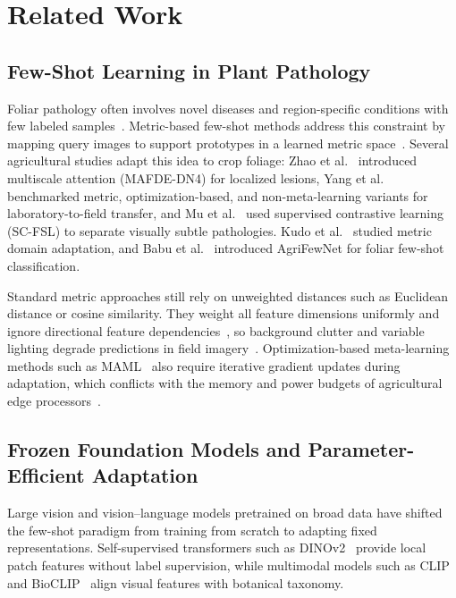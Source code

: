 \section{Related Work}
\label{sec:related_work}

\subsection{Few-Shot Learning in Plant Pathology}
Foliar pathology often involves novel diseases and region-specific conditions with few labeled samples~\cite{shoaib2023advanced,sun2024few}. Metric-based few-shot methods address this constraint by mapping query images to support prototypes in a learned metric space~\cite{snell2017prototypical}. Several agricultural studies adapt this idea to crop foliage: Zhao et al.~\cite{zhao2024mafde} introduced multiscale attention (MAFDE-DN4) for localized lesions, Yang et al.~\cite{yang2024laboratory} benchmarked metric, optimization-based, and non-meta-learning variants for laboratory-to-field transfer, and Mu et al.~\cite{mu2024few} used supervised contrastive learning (SC-FSL) to separate visually subtle pathologies. Kudo et al.~\cite{kudo2024few} studied metric domain adaptation, and Babu et al.~\cite{babu2025agrifewnet} introduced AgriFewNet for foliar few-shot classification.

Standard metric approaches still rely on unweighted distances such as Euclidean distance or cosine similarity. They weight all feature dimensions uniformly and ignore directional feature dependencies~\cite{bateni2020improved}, so background clutter and variable lighting degrade predictions in field imagery~\cite{yang2024laboratory}. Optimization-based meta-learning methods such as MAML~\cite{finn2017maml} also require iterative gradient updates during adaptation, which conflicts with the memory and power budgets of agricultural edge processors~\cite{radocaj2025evolution}.

\subsection{Frozen Foundation Models and Parameter-Efficient Adaptation}
Large vision and vision--language models pretrained on broad data have shifted the few-shot paradigm from training from scratch to adapting fixed representations. Self-supervised transformers such as DINOv2~\cite{oquab2023dinov2} provide local patch features without label supervision, while multimodal models such as CLIP~\cite{radford2021clip} and BioCLIP~\cite{stevens2024bioclip} align visual features with botanical taxonomy.


